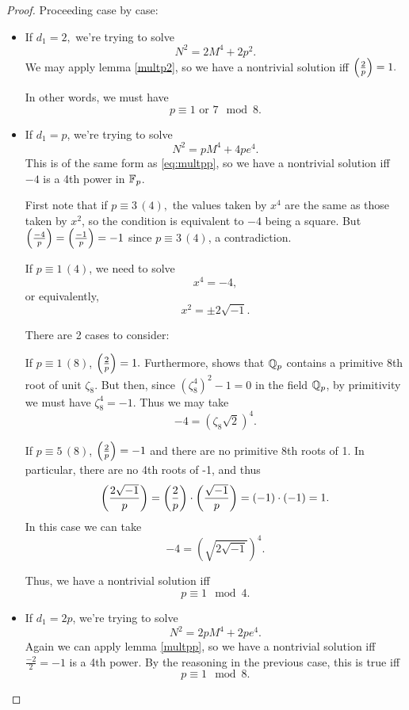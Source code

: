 \documentclass[12pt, a4paper]{amsart}
\begin{document}
\begin{proof} Proceeding case by case:
  \begin{itemize}

   
  \item If $d_1 = 2,$ we're trying to solve
    \[N^2 = 2M^4 + 2p^2.\]
    We may apply lemma \autoref{multp2}, so we have a nontrivial solution
    iff $\left(\frac{2}{p}\right) = 1.$
    
    In other words, we must have
    \[p \equiv 1 \text{ or } 7 \mod{8}.\]
      
  \item If $d_1 = p$, we're trying to solve
    \[N^2 = pM^4 + 4pe^4.\]
    This is of the same form as \autoref{eq:multpp}, so we have a nontrivial
    solution iff $-4$ is a 4th power in $\mathbb{F}_p$.

    First note that if
    $p \equiv 3 \,(4),$ the values taken by $x^4$ are the same as those taken
    by $x^2$, so the condition is equivalent to $-4$ being a square.
    But $\left(\frac{-4}{p}\right) = \left(\frac{-1}{p}\right) = -1$ since $p \equiv 3 \, (4)$,
    a contradiction.

    If $p \equiv 1 \,(4)$, we need to solve
    \[x^4 = -4,\]
    or equivalently,
    \[x^2 = \pm 2\sqrt{-1}.\]

    There are 2 cases to consider:

    If $p \equiv 1 \, (8)$, $\left(\frac{2}{p}\right) = 1.$ Furthermore,
    \cite[page 4, Theorem 3.1]{Hensel} shows that
    ${\mathbb Q}_p$ contains a primitive 8th root of unit $\zeta_8$. But then, since
    $(\zeta_8^4)^2 - 1 = 0$ in the field ${\mathbb Q}_p$, by primitivity we must have
    $\zeta_8^4 = -1$. Thus we may take
    \[-4 = (\zeta_8\sqrt{2})^4.\]

    If $p \equiv 5 \, (8)$, $\left(\frac{2}{p}\right) = -1$ and there are no primitive
    8th roots of 1. In particular, there are no 4th roots of -1, and thus
    \[\left(\frac{2\sqrt{-1}}{p}\right) = \left(\frac{2}{p}\right) \cdot \left(\frac{\sqrt{-1}}{p}\right) =
      (-1)\cdot(-1) = 1.\]
    In this case we can take
    \[-4 = \left(\sqrt{2\sqrt{-1}}\right)^4.\]

    Thus, we have a nontrivial solution iff
    \[p \equiv 1 \mod{4}.\]


  \item If $d_1 = 2p$, we're trying to solve
    \[N^2 = 2pM^4 + 2pe^4.\]
    Again we can apply lemma \ref{multpp}, so we have a nontrivial solution iff
    $\frac{-2}{2} = -1$ is a 4th power. By the reasoning in the previous case,
    this is true iff
    \[p \equiv 1 \mod{8}.\]


\end{itemize}
\end{proof}
\end{document}
